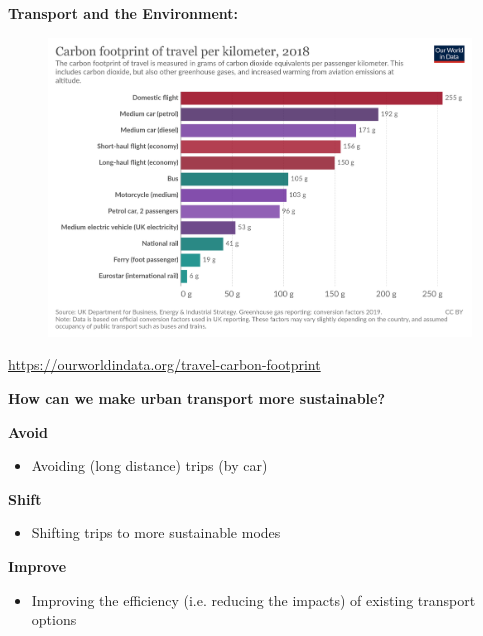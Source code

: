 \documentclass[aspectratio=169]{beamer}
\begin{document}
\begin{frame}
	
	\textbf{Transport and the Environment:}
	
	\begin{figure}
		\centering
		\includegraphics[width=0.84\linewidth]{images/carbon-footprint-travel-mode.png}
	\end{figure}

	\tiny\url{https://ourworldindata.org/travel-carbon-footprint}
	
\end{frame}




\begin{frame}
	
	\textbf{How can we make urban transport more sustainable?}
	
	\vspace{6mm}
	
	\textbf{Avoid}
	\begin{itemize}
		\item Avoiding (long distance) trips (by car)
	\end{itemize}

	\textbf{Shift}
	\begin{itemize}
		\item Shifting trips to more sustainable modes
	\end{itemize}

	\textbf{Improve}
	\begin{itemize}
		\item Improving the efficiency (i.e. reducing the impacts) of existing transport options
	\end{itemize}

	\vspace{2mm}
	
	
	
\end{frame}
\end{document}
